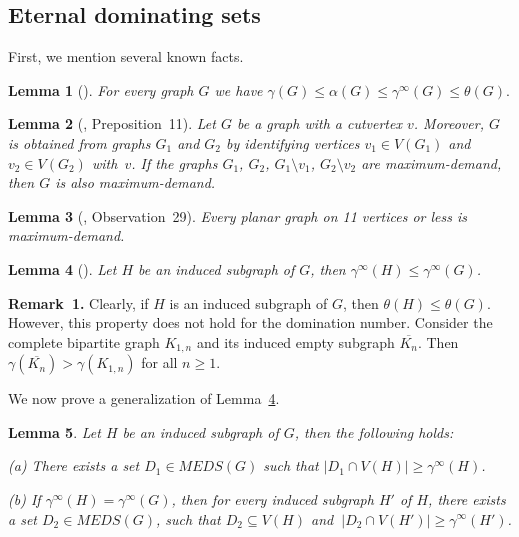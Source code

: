 \documentclass[12pt]{article}
\newtheorem{lemma}{Lemma}
\begin{document}
\subsection{Eternal dominating sets}

First, we mention several known facts.

\begin{lemma}[\cite{BCGMVW04}]\label{l3}
For every graph $G$ we have $\gamma(G) \leq \alpha(G) \leq \gamma^{\infty}(G) \leq \theta(G).$
\end{lemma}

\begin{lemma}[\cite{ABBCVY07}, Preposition~11]\label{l4} 
Let $G$ be a graph with a cutvertex $v$. Moreover, $G$ is obtained from graphs $G_1$ and $G_2$ by identifying vertices $v_1 \in V(G_1)$ and $v_2 \in V(G_2)$ with~$v$. If the graphs $G_1$, $G_2$, $G_1 \setminus v_1$, $G_2 \setminus v_2$ are maximum-demand, then $G$ is also maximum-demand.
\end{lemma}

\begin{lemma}[\cite{MMV22}, Observation~29]\label{l5} Every planar graph on 11 vertices or less is maximum-demand.
\end{lemma}

\begin{lemma}[\cite{KM09}]\label{l6}
Let $H$ be an induced subgraph of $G$, then $\gamma^{\infty}(H) \leq \gamma^{\infty}(G)$.
\end{lemma}

\textbf{Remark~1.} Clearly, if $H$ is an induced subgraph of $G$, then $\theta(H) \leq \theta(G)$. However, this property does not hold for the domination number. Consider the complete bipartite graph $K_{1,n}$ and its induced empty subgraph $\overline{K_n}$. Then $\gamma(\overline{K_n}) > \gamma(K_{1,n})$ for all $n \geq 1$.

We now prove a generalization of Lemma~\ref{l6}.

\begin{lemma}\label{l7}
Let $H$ be an induced subgraph of $G$, then the following holds:

(a) There exists a set $D_1 \in MEDS(G)$ such that $|D_1 \cap  V(H)| \geq \gamma^{\infty}(H)$.

(b) If $\gamma^{\infty}(H) = \gamma^{\infty}(G)$, then for every induced subgraph $H'$ of $H$, there exists a set $D_2 \in MEDS(G)$, such that $D_2 \subseteq V(H)$ and $\ |D_2 \cap V(H')| \geq \gamma^{\infty}(H')$.

\end{lemma}
\end{document}
